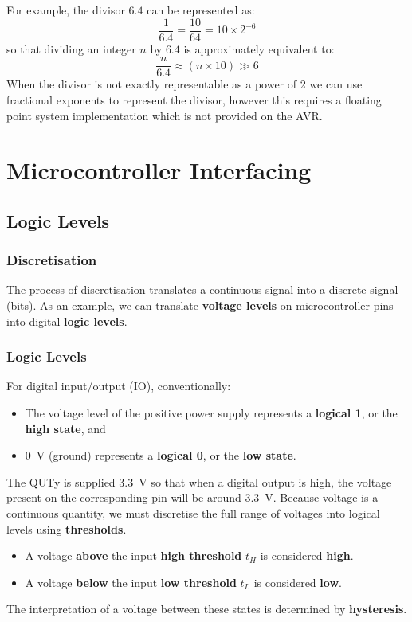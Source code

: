 \documentclass{report}
\begin{document}
For example, the divisor \(6.4\) can be represented as:
\begin{equation*}
    \frac{1}{6.4} = \frac{10}{64} = 10 \times 2^{-6}
\end{equation*}
so that dividing an integer \(n\) by \(6.4\) is approximately equivalent to:
\begin{equation*}
    \frac{n}{6.4} \approx \left( n \times 10 \right) \gg 6
\end{equation*}
When the divisor is not exactly representable as a power of 2 we can use fractional
exponents to represent the divisor, however this requires a floating point
system implementation which is not provided on the AVR\@.
\chapter{Microcontroller Interfacing}
\section{Logic Levels}
\subsection{Discretisation}
The process of discretisation translates a continuous signal into a
discrete signal (bits). As an example, we can translate \textbf{voltage
levels} on microcontroller pins into digital \textbf{logic levels}.
\subsection{Logic Levels}
For digital input/output (IO), conventionally:
\begin{itemize}
    \item The voltage level of the positive power supply represents a
          \textbf{logical 1}, or the \textbf{high state}, and
    \item \qty{0}{V} (ground) represents a \textbf{logical 0}, or the \textbf{low state}.
\end{itemize}
The QUTy is supplied \qty{3.3}{V} so that when a digital output is high,
the voltage present on the corresponding pin will be around \qty{3.3}{V}.
Because voltage is a continuous quantity, we must discretise the full range of voltages into logical levels using \textbf{thresholds}.
\begin{itemize}
    \item A voltage \textbf{above} the input \textbf{high threshold}
          \(t_H\) is considered \textbf{high}.
    \item A voltage \textbf{below} the input \textbf{low threshold}
          \(t_L\) is considered \textbf{low}.
\end{itemize}
The interpretation of a voltage between these states is determined by \textbf{hysteresis}.
\end{document}
